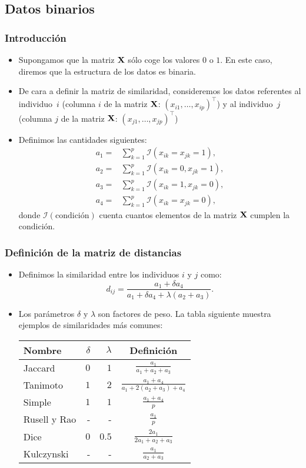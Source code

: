\subsection{Datos binarios}
\begin{frame}
\frametitle{Introducción}
\begin{itemize}
\item<2->{Supongamos que la matriz $\mathbf{X}$ sólo coge los valores $0$ o $1$. En este caso, diremos que la estructura de los datos es binaria.}
\item<3->{De cara a definir la matriz de similaridad, consideremos los datos referentes al individuo~$i$ (columna $i$ de la matriz $\mathbf{X}$: $(x_{i1},\ldots,x_{ip})^\top$) y al individuo~$j$ (columna $j$ de la matriz $\mathbf{X}$: $(x_{j1},\ldots,x_{jp})^\top$)}
\item<4->{Definimos las cantidades siguientes:
$$
\begin{array}{rl}
a_1 = & \sum_{k=1}^p \mathcal{I}(x_{ik}=x_{jk}=1), \\
a_2 = & \sum_{k=1}^p \mathcal{I}(x_{ik}=0, x_{jk}=1), \\
a_3 = & \sum_{k=1}^p \mathcal{I}(x_{ik}=1, x_{jk}=0), \\
a_4 = & \sum_{k=1}^p \mathcal{I}(x_{ik}=x_{jk}=0),
\end{array}
$$
donde $\mathcal{I}(\mbox{condición})$ cuenta cuantos elementos de la matriz $\mathbf{X}$ cumplen la condición.}
\end{itemize}
\end{frame}
\begin{frame}
\frametitle{Definición de la matriz de distancias}
\begin{itemize}
\item<2->{Definimos la similaridad entre los individuos $i$ y $j$ como:
$$
d_{ij}=\frac{a_1 + \delta a_4}{a_1 + \delta a_4 +\lambda (a_2 + a_3)}.
$$
}
\item<3->{Los parámetros $\delta$ y $\lambda$ son factores de peso. La tabla siguiente muestra ejemplos de similaridades más comunes:
\vskip 0.25cm
\begin{tabular}{|l|r|r|c|}
\hline
Nombre&$\delta$&$\lambda$&Definición\\\hline
Jaccard&$0$&$1$&$\frac{a_1}{a_1 + a_2 +a_3}$ \\\hline
Tanimoto&$1$&$2$&$\frac{a_1+a_4}{a_1+2(a_2+a_3)+a_4}$\\\hline
Simple&$1$&$1$&$\frac{a_1 + a_4}{p}$\\\hline
Rusell y Rao&-&-&$\frac{a_1}{p}$\\\hline
Dice&$0$&$0.5$&$\frac{2a_1}{2a_1 + a_2 +a_3}$ \\\hline
Kulczynski&-&-&$\frac{a_1}{a_2 + a_3}$\\\hline
\end{tabular}}
\end{itemize}
\end{frame}
